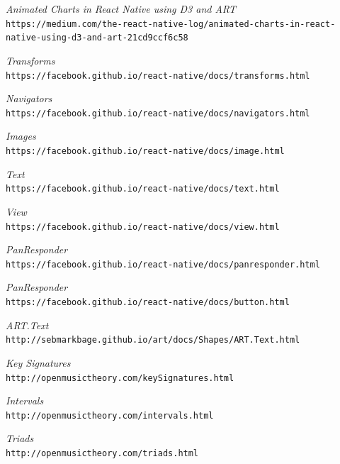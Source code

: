 \documentclass[onecolumn, draftclsnofoot,10pt, compsoc]{IEEEtran}
\begin{document}
\begin{thebibliography}{9}

  \textit{Animated Charts in React Native using D3 and ART}
  \\\texttt{{https://medium.com/the-react-native-log/animated-charts-in-react-native-using-d3-and-art-21cd9ccf6c58}}

  \textit {Transforms}
  \\\texttt {{https://facebook.github.io/react-native/docs/transforms.html}}


  \textit {Navigators}
  \\\texttt {{https://facebook.github.io/react-native/docs/navigators.html}}

  \textit {Images}
  \\\texttt {{https://facebook.github.io/react-native/docs/image.html}}

  \textit {Text}
  \\\texttt {{https://facebook.github.io/react-native/docs/text.html}}

  \textit {View}
  \\\texttt {{https://facebook.github.io/react-native/docs/view.html}}

  \textit {PanResponder}
  \\\texttt {{https://facebook.github.io/react-native/docs/panresponder.html}}

  \textit {PanResponder}
  \\\texttt {{https://facebook.github.io/react-native/docs/button.html}}

  \textit {ART.Text}
  \\\texttt {{http://sebmarkbage.github.io/art/docs/Shapes/ART.Text.html}}

  \textit {Key Signatures}
  \\\texttt {{http://openmusictheory.com/keySignatures.html}}

  \textit {Intervals}
  \\\texttt {{http://openmusictheory.com/intervals.html}}

  \textit {Triads}
  \\\texttt {{http://openmusictheory.com/triads.html}}

\end{thebibliography}
\end{document}
